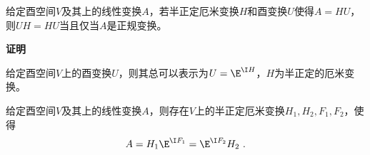 \begin{theorem}{}
给定酉空间$V$及其上的线性变换$A$，若半正定厄米变换$H$和酉变换$U$使得$A=HU$，则$UH=HU$当且仅当$A$是正规变换。
\end{theorem}
\textbf{证明}
\begin{theorem}{}
给定酉空间$V$上的酉变换$U$，则其总可以表示为$U=\E^{\I H}$，$H$为半正定的厄米变换。
\end{theorem}
\begin{corollary}{}
给定酉空间$V$及其上的线性变换$A$，则存在$V$上的半正定厄米变换$H_1,H_2,F_1,F_2$，使得
\begin{equation}
A=H_1\E^{\I F_1}=\E^{\I F_2}H_2~.
\end{equation}
\end{corollary}
